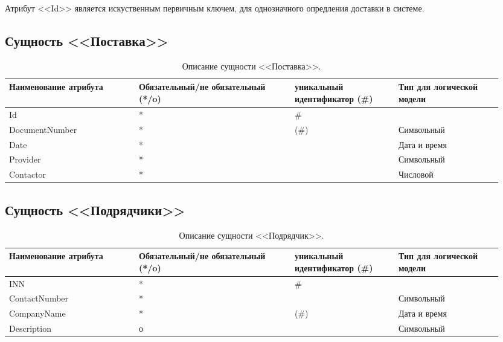 \documentclass[14pt]{extreport}
\begin{document}
        Атрибут <<Id>> является искуственным первичным ключем, для однозначного опредления доставки в системе.
    
    \subsection*{Сущность <<Поставка>>}

        \begin{table}[H]
            \begin{tabular}{|p{0.25\linewidth}|p{0.3\linewidth}|p{0.2\linewidth}|p{0.2\linewidth}|}
                \hline
                Наименование атрибута & Обязательный/не обязательный (*/o) & уникальный идентификатор (\#) & Тип для логической модели
                \\ \hline
                Id & * & \# & \\ \hline
                DocumentNumber & * & (\#) & Символьный\\ \hline
                Date & * & & Дата и время \\ \hline
                Provider & * & & Символьный \\ \hline
                Contactor & * & & Числовой \\ \hline
            \end{tabular}
            \caption{Описание сущности <<Поставка>>.}
        \end{table}

    \subsection*{Сущность <<Подрядчики>>}

        \begin{table}[H]
            \begin{tabular}{|p{0.25\linewidth}|p{0.3\linewidth}|p{0.2\linewidth}|p{0.2\linewidth}|}
                \hline
                Наименование атрибута & Обязательный/не обязательный (*/o) & уникальный идентификатор (\#) & Тип для логической модели
                \\ \hline
                INN & * & \# & \\ \hline
                ContactNumber & * &  & Символьный\\ \hline
                CompanyName & * & (\#) & Дата и время \\ \hline
                Description & о & & Символьный \\ \hline
            \end{tabular}
            \caption{Описание сущности <<Подрядчик>>.}
        \end{table}
    
\end{document}
